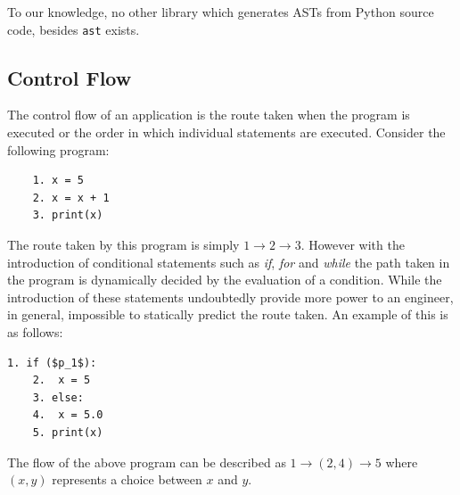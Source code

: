 \documentclass[12pt, titlepage]{article}
\begin{document}
\indent To our knowledge, no other library which generates ASTs from Python source code, besides \texttt{ast} exists.

\subsection{Control Flow}
The control flow of an application is the route taken when the program is executed or the order in which individual statements are executed. Consider the following program:
\begin{lstlisting}
	1. x = 5
	2. x = x + 1
	3. print(x)
\end{lstlisting}
The route taken by this program is simply $1 \rightarrow 2 \rightarrow 3$. However with the introduction of conditional statements such as \textit{if}, \textit{for} and \textit{while} the path taken in the program is dynamically decided by the evaluation of a condition. While the introduction of these statements undoubtedly provide more power to an engineer, in general, impossible to statically predict the route taken. An example of this is as follows:
\begin{lstlisting}[mathescape]
	1. if ($p_1$):
	2. 	x = 5
	3. else:
	4. 	x = 5.0
	5. print(x)
\end{lstlisting}
The flow of the above program can be described as $1 \rightarrow (2, 4) \rightarrow 5$ where $(x, y)$ represents a choice between $x$ and $y$.
\end{document}
